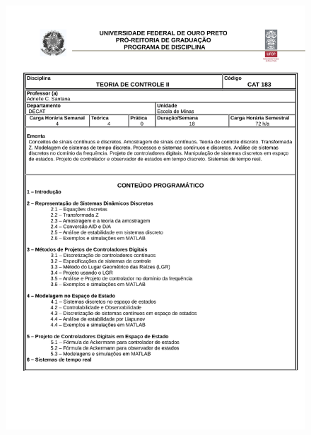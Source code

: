 \begin{figure}[p]
	\centering 
	\includegraphics[scale=0.7]{capitulos/anexo1-programas-disciplina/p63.pdf}
\end{figure}

